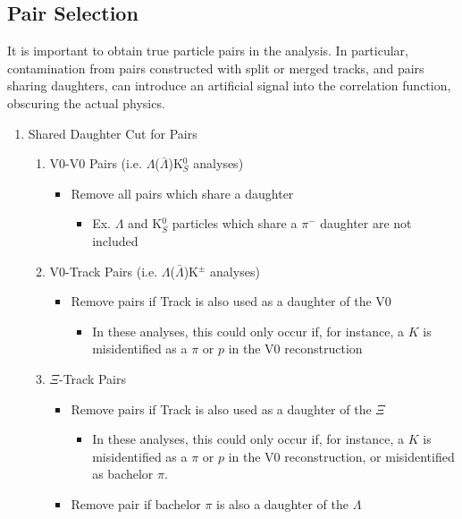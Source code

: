 \documentclass[../AnalysisNoteJBuxton.tex]{subfiles}
\begin{document}
\subsection{Pair Selection}
\label{PairSelection}

It is important to obtain true particle pairs in the analysis.  In particular, contamination from pairs constructed with split or merged tracks, and pairs sharing daughters, can introduce an artificial signal into the correlation function, obscuring the actual physics.

\begin{enumerate}
 \item Shared Daughter Cut for Pairs
 \begin{enumerate}
  \item V0-V0 Pairs (i.e. $\Lambda$($\bar{\Lambda}$)K$^{0}_{S}$ analyses)
  \begin{itemize}
   \item Remove all pairs which share a daughter 
   \begin{itemize}
    \item Ex. $\Lambda$ and K$^{0}_{S}$ particles which share a $\pi^{-}$ daughter are not included
   \end{itemize} 
  \end{itemize}
  \item V0-Track Pairs (i.e. $\Lambda$($\bar{\Lambda}$)K$^{\pm}$ analyses)
  \begin{itemize}
   \item Remove pairs if Track is also used as a daughter of the V0
   \begin{itemize}
    \item In these analyses, this could only occur if, for instance, a $K$ is misidentified as a $\pi$ or $p$ in the V0 reconstruction
   \end{itemize}
  \end{itemize}
  \item $\Xi$-Track Pairs
  \begin{itemize}
   \item Remove pairs if Track is also used as a daughter of the $\Xi$
   \begin{itemize}
    \item In these analyses, this could only occur if, for instance, a $K$ is misidentified as a $\pi$ or $p$ in the V0 reconstruction, or misidentified as bachelor $\pi$.
   \end{itemize}
   \item Remove pair if bachelor $\pi$ is also a daughter of the $\Lambda$

\end{itemize}
\end{enumerate}
\end{enumerate}
\end{document}
